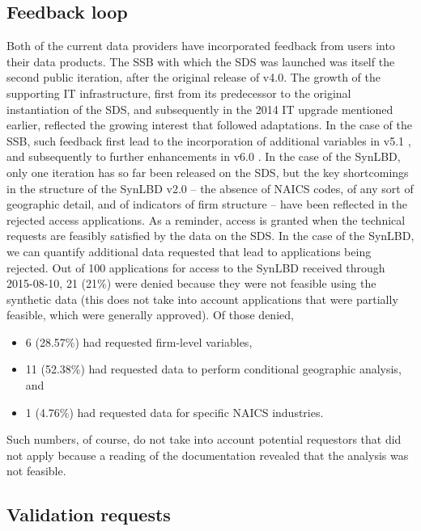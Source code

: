 \subsection{Feedback loop}
Both of the current data providers have incorporated feedback from users into their data products. The \ac{SSB} with which the \ac{SDS} was launched was itself the second public iteration, after the original release of v4.0. The growth of the supporting IT infrastructure, first from its predecessor to the original instantiation of the \ac{SDS}, and subsequently in the 2014 IT upgrade mentioned earlier, reflected the growing interest that followed adaptations. In the case of the \ac{SSB}, such feedback first lead to the incorporation of additional variables in v5.1 \citep{SSB5.1}, and subsequently to further enhancements in v6.0 \citep{SSB6}.
In the case of the \ac{SynLBD}, only one iteration has so far been released on the \ac{SDS}, but the key shortcomings in the structure of the SynLBD v2.0 \citep{SynLBD20} -- the absence of \ac{NAICS} codes, of any sort of geographic detail, and of indicators of firm structure -- have been reflected in the rejected access applications.
As a reminder, access is granted when the technical requests are feasibly satisfied by the data on the \ac{SDS}.
In the case of the SynLBD, we can quantify additional data requested that lead to applications being rejected.
Out of 100 applications for access to the \ac{SynLBD} received through 2015-08-10, 21 (21\%) were denied because they were not feasible using the synthetic data (this does not take into account applications that were partially feasible, which were generally approved). Of those denied,
\begin{itemize}
\item 6 (28.57\%) had requested firm-level variables,
\item 11 (52.38\%) had requested data to perform conditional geographic analysis, and
\item 1 (4.76\%) had requested data for specific \ac{NAICS} industries.
\end{itemize}
Such numbers, of course, do not take into account potential requestors that did not apply because a reading of the documentation revealed that the analysis was not feasible.

\subsection{Validation requests}

